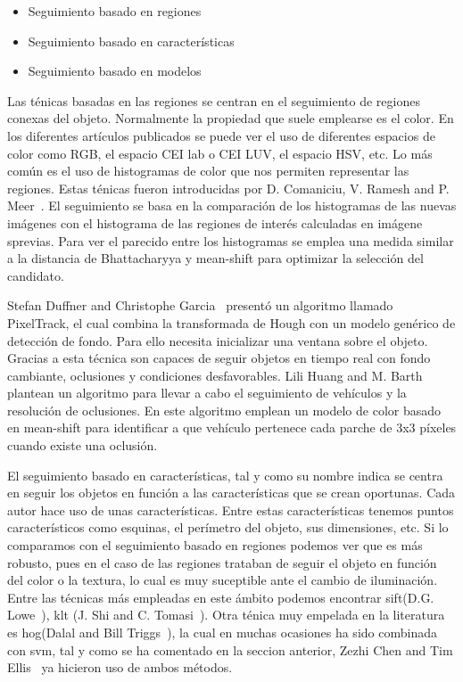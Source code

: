 \begin{itemize}
    \item Seguimiento basado en regiones
    \item Seguimiento basado en características
    \item Seguimiento basado en modelos
\end{itemize}

Las ténicas basadas en las regiones se centran en el seguimiento de regiones conexas del objeto. Normalmente la propiedad que suele emplearse es el color. En los diferentes artículos publicados se puede ver el uso de diferentes espacios de color como RGB, el espacio CEI lab o CEI LUV, el espacio HSV, etc. Lo más común es el uso de histogramas de color que nos permiten representar las regiones. Estas ténicas fueron introducidas por D. Comaniciu, V. Ramesh and P. Meer~\cite{kernel_based_object}. El seguimiento se basa en la comparación de los histogramas de las nuevas imágenes con el histograma de las regiones de interés calculadas en imágene sprevias. Para ver el parecido entre los histogramas se emplea una medida similar a la distancia de Bhattacharyya y mean-shift para optimizar la selección del candidato.

Stefan Duffner and Christophe Garcia~\cite{pixeltrack} presentó un algoritmo llamado PixelTrack, el cual combina la transformada de Hough con un modelo genérico de detección de fondo. Para ello necesita inicializar una ventana sobre el objeto. Gracias a esta técnica son capaces de seguir objetos en tiempo real con fondo cambiante, oclusiones y condiciones desfavorables.
Lili Huang and M. Barth~\cite{real_time_vehicle} plantean un algoritmo para llevar a cabo el seguimiento de vehículos y la resolución de oclusiones. En este algoritmo emplean un modelo de color basado en mean-shift para identificar a que vehículo pertenece cada parche de 3x3 píxeles cuando existe una oclusión.

El seguimiento basado en características, tal y como su nombre indica se centra en seguir los objetos en función a las características que se crean oportunas. Cada autor hace uso de unas características. Entre estas características tenemos puntos característicos como esquinas, el perímetro del objeto, sus dimensiones, etc. Si lo comparamos con el seguimiento basado en regiones podemos ver que es más robusto, pues en el caso de las regiones trataban de seguir el objeto en función del color o la textura, lo cual es muy suceptible ante el cambio de iluminación. Entre las técnicas más empleadas en este ámbito podemos encontrar \acrfull{sift}(D.G. Lowe~\cite{article_sift}), \acrfull{klt} (J. Shi and C. Tomasi~\cite{article_klt}). Otra ténica muy empelada en la literatura es \acrshort{hog}(Dalal and Bill Triggs~\cite{hog_paper}), la cual en muchas ocasiones ha sido combinada con \acrshort{svm}, tal y como se ha comentado en la seccion anterior, Zezhi Chen and Tim Ellis~\cite{multi_shape_descriptor} ya hicieron uso de ambos métodos.


